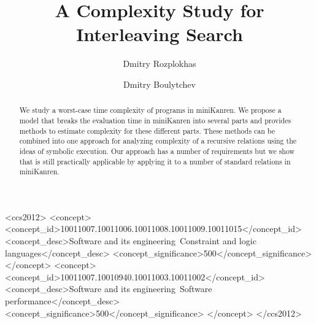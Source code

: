 \documentclass[acmsmall, anonymous, review]{acmart}
\newcommand{\mK}{miniKanren\xspace}
\begin{document}
\title{A Complexity Study for Interleaving Search}

\author{Dmitry Rozplokhas}
\author{Dmitry Boulytchev}


\begin{abstract}
  We study a worst-case time complexity of programs in \mK. We propose a model that breaks the evaluation time in \mK into
  several parts and provides methods to estimate complexity for these different parts. These methods can be combined into one approach for
  analyzing complexity of a recursive relations using the ideas of symbolic execution. Our approach has a number of requirements but we show
  that is still practically applicable by applying it to a number of standard relations in \mK.
\end{abstract}

\begin{CCSXML}
<ccs2012>
<concept>
<concept_id>10011007.10011006.10011008.10011009.10011015</concept_id>
<concept_desc>Software and its engineering~Constraint and logic languages</concept_desc>
<concept_significance>500</concept_significance>
</concept>
<concept>
<concept_id>10011007.10010940.10011003.10011002</concept_id>
<concept_desc>Software and its engineering~Software performance</concept_desc>
<concept_significance>500</concept_significance>
</concept>
</ccs2012>
\end{CCSXML}
\end{document}
